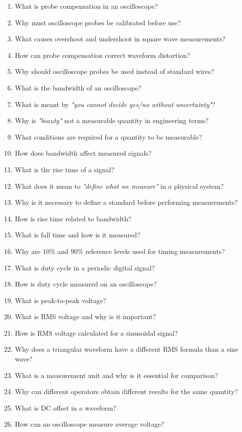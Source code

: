 \documentclass[../main.tex]{subfiles}
\begin{document}
\begin{enumerate}[label=\textbf{\arabic*.}]
	\item What is probe compensation in an oscilloscope?
	\item Why must oscilloscope probes be calibrated before use?
	\item What causes overshoot and undershoot in square wave measurements?
	\item How can probe compensation correct waveform distortion?
	\item Why should oscilloscope probes be used instead of standard wires?
	\item What is the bandwidth of an oscilloscope?
	\item What is meant by \textit{"you cannot decide yes/no without uncertainty"}?
	\item Why is \textit{"beauty"} not a measurable quantity in engineering terms?
	\item What conditions are required for a quantity to be measurable?
	\item How does bandwidth affect measured signals?
	\item What is the rise time of a signal?
	\item What does it mean to \textit{"define what we measure"} in a physical system?
	\item Why is it necessary to define a standard before performing measurements?
	\item How is rise time related to bandwidth?
	\item What is fall time and how is it measured?
	\item Why are 10\% and 90\% reference levels used for timing measurements?
	\item What is duty cycle in a periodic digital signal?
	\item How is duty cycle measured on an oscilloscope?
	\item What is peak-to-peak voltage?
	\item What is RMS voltage and why is it important?
	\item How is RMS voltage calculated for a sinusoidal signal?
	\item Why does a triangular waveform have a different RMS formula than a sine wave?
	\item What is a measurement unit and why is it essential for comparison?
	\item Why can different operators obtain different results for the same quantity?
	\item What is DC offset in a waveform?
	\item How can an oscilloscope measure average voltage?

\end{enumerate}
\end{document}
